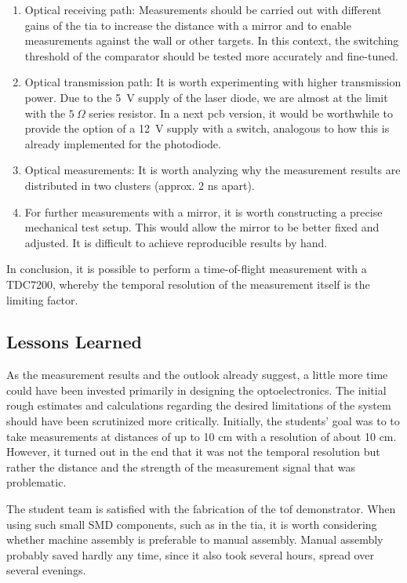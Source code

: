 \begin{enumerate}
            possible to improve the measurement results.
      \item Optical receiving path: Measurements should be carried out with different gains of the \acrshort{tia} to
            increase the distance with a mirror and to enable measurements against the wall or other targets.
            In this context, the switching threshold of the comparator should be tested more accurately and fine-tuned.
      \item Optical transmission path: It is worth experimenting with higher transmission power. Due to the 5~V supply
            of the laser diode, we are almost at the limit with the $5~\Omega$ series resistor. In a next \acrshort{pcb}
            version, it would be worthwhile to provide the option of a 12~V supply with a switch, analogous to how this is
            already implemented for the photodiode.
      \item Optical measurements: It is worth analyzing why the measurement results are distributed in two clusters
            (approx. 2 ns apart).
      \item For further measurements with a mirror, it is worth constructing a precise mechanical test setup.
            This would allow the mirror to be better fixed and adjusted. It is difficult to achieve reproducible results by hand.
\end{enumerate}

In conclusion, it is possible to perform a time-of-flight measurement with a TDC7200,
whereby the temporal resolution of the measurement itself is the limiting factor.

\subsection{Lessons Learned}

As the measurement results and the outlook already suggest, a little more time could have been invested primarily in
designing the optoelectronics. The initial rough estimates and calculations regarding the desired limitations of the
system should have been scrutinized more critically. Initially, the students' goal was to to take measurements at
distances of up to 10 cm with a resolution of about 10 cm. However, it turned out in the end that it was not the
temporal resolution but rather the distance and the strength of the measurement signal that was problematic.

The student team is satisfied with the fabrication of the \acrshort{tof} demonstrator. When using such small
SMD components, such as in the \acrshort{tia}, it is worth considering whether
machine assembly is preferable to manual assembly. Manual assembly probably saved hardly any
time, since it also took several hours, spread over several evenings.


